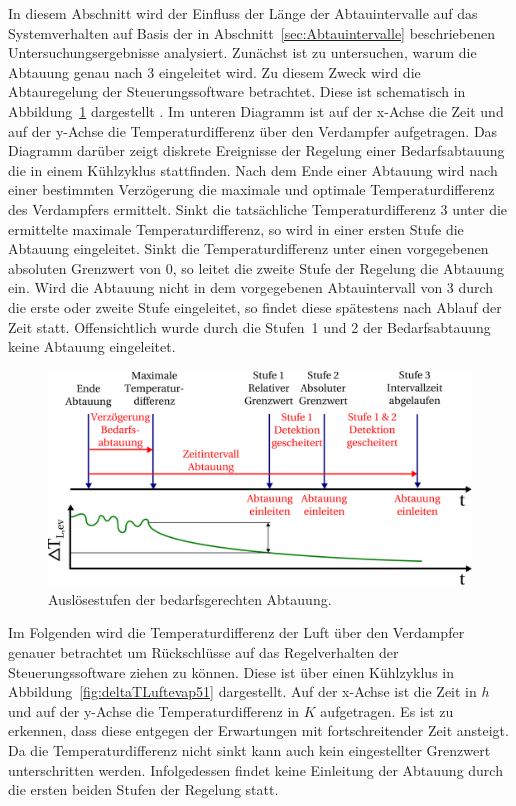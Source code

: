 In diesem Abschnitt wird der Einfluss der Länge der Abtauintervalle auf das Systemverhalten auf Basis der in Abschnitt~\ref{sec:Abtauintervalle} beschriebenen Untersuchungsergebnisse analysiert. \newline
Zunächst ist zu untersuchen, warum die Abtauung genau nach \unit{3}{\hour} eingeleitet wird. Zu diesem Zweck wird die Abtauregelung der Steuerungssoftware betrachtet. Diese ist schematisch in Abbildung~\ref{fig:bedarfsgerechteAbtauung} dargestellt \cite{EmersonClimateTechnologies.2017}. Im unteren Diagramm ist auf der x-Achse die Zeit und auf der y-Achse die Temperaturdifferenz über den Verdampfer aufgetragen. Das Diagramm darüber zeigt diskrete Ereignisse  der Regelung einer Bedarfsabtauung die in einem Kühlzyklus stattfinden.
Nach dem Ende einer Abtauung wird nach einer bestimmten Verzögerung die maximale und optimale Temperaturdifferenz des Verdampfers ermittelt. Sinkt die tatsächliche Temperaturdifferenz \unit{3}{\kelvin} unter die ermittelte maximale Temperaturdifferenz, so wird in einer ersten Stufe die Abtauung eingeleitet. Sinkt die Temperaturdifferenz unter einen vorgegebenen absoluten Grenzwert von \unit{0}{\kelvin}, so leitet die zweite Stufe der Regelung die Abtauung ein. Wird die Abtauung nicht in dem vorgegebenen Abtauintervall von \unit{3}{\hour} durch die erste oder zweite Stufe eingeleitet, so findet diese spätestens nach Ablauf der Zeit statt. Offensichtlich wurde durch die Stufen~1 und 2 der Bedarfsabtauung keine Abtauung eingeleitet. 

\begin{figure}[h!]
\centering
\includegraphics[scale=0.54]{Pictures/defrostintervall.pdf}
\caption{Auslösestufen der bedarfsgerechten Abtauung.}
\label{fig:bedarfsgerechteAbtauung}
\end{figure}

Im Folgenden wird die Temperaturdifferenz der Luft über den Verdampfer genauer betrachtet um Rückschlüsse auf das Regelverhalten der Steuerungssoftware ziehen zu können. Diese ist über einen Kühlzyklus in Abbildung~\ref{fig:deltaTLuftevap51} dargestellt. Auf der x-Achse ist die Zeit in $h$ und auf der y-Achse die Temperaturdifferenz in $K$ aufgetragen. Es ist zu erkennen, dass diese entgegen der Erwartungen mit fortschreitender Zeit ansteigt. Da die Temperaturdifferenz nicht sinkt kann auch kein eingestellter Grenzwert unterschritten werden. Infolgedessen findet keine Einleitung der Abtauung durch die ersten beiden Stufen der Regelung statt. 

